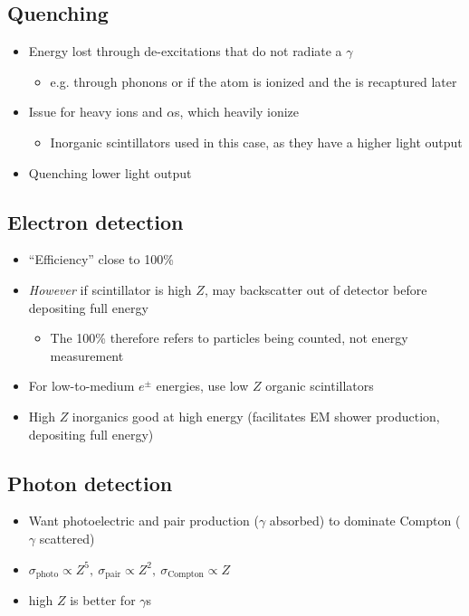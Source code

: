 \subsection{Quenching}
\begin{itemize}
  \item Energy lost through de-excitations that do not radiate a $\gamma$ 
  \begin{itemize}
    \item e.g. through phonons or if the atom is ionized and the \el is recaptured later
  \end{itemize}
  \item Issue for heavy ions and $\alpha$s, which heavily ionize
  \begin{itemize}
    \item Inorganic scintillators used in this case, as they have a higher light output
  \end{itemize}
  \item Quenching \thus lower light output
\end{itemize}

\subsection{Electron detection}
\begin{itemize}
  \item ``Efficiency'' close to 100\%
  \item \emph{However} if scintillator is high $Z$, may backscatter out of detector before depositing full energy
  \begin{itemize}
    \item The 100\% therefore refers to particles being counted, not energy measurement
  \end{itemize}
  \item For low-to-medium $e^\pm$ energies, use low $Z$ organic scintillators
  \item High $Z$ inorganics good at high energy (facilitates EM shower production, depositing full energy)
\end{itemize}

\subsection{Photon detection}
\begin{itemize}
  \item Want photoelectric and pair production ($\gamma$ absorbed) to dominate Compton ($\gamma$ scattered)
  \item $\sigma_\text{photo}\propto Z^5,~\sigma_\text{pair}\propto Z^2,~\sigma_\text{Compton}\propto Z$
  \item \thus high $Z$ is better for $\gamma$s
\end{itemize}

